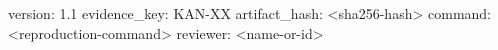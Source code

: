\begin{evidencecontract}
version: 1.1
evidence_key: KAN-XX
artifact_hash: <sha256-hash>
command: <reproduction-command>
reviewer: <name-or-id>
\end{evidencecontract}